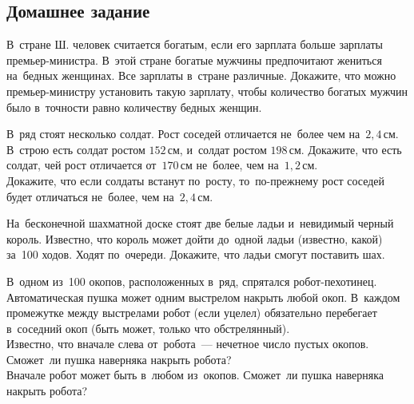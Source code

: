 

\subsection*{Домашнее задание}



\begin{problems}

\item
В~стране Ш. человек считается богатым, если его зарплата больше зарплаты
премьер-министра.
В~этой стране богатые мужчины предпочитают жениться на~бедных женщинах.
Все зарплаты в~стране различные.
Докажите, что можно премьер-министру установить такую зарплату, чтобы
количество богатых мужчин было в~точности равно количеству бедных женщин.

\item
В~ряд стоят несколько солдат.
Рост соседей отличается не~более чем на~$2{,}4\,\text{см}$.
\\
\sp
В~строю есть солдат ростом $152\,\text{см}$, и~солдат ростом $198\,\text{см}$.
Докажите, что есть солдат, чей рост отличается от~$170\,\text{см}$ не~более, чем
на~$1{,}2\,\text{см}$.
\\
\sp
Докажите, что если солдаты встанут по~росту, то~по-прежнему рост соседей будет
отличаться не~более, чем на~$2{,}4\,\text{см}$.

\item
На~бесконечной шахматной доске стоят две белые ладьи и~невидимый черный король.
Известно, что король может дойти до~одной ладьи (известно, какой) за~100 ходов.
Ходят по~очереди.
Докажите, что ладьи смогут поставить шах.

\item
В~одном из~100 окопов, расположенных в~ряд, спрятался робот-пехотинец.
Автоматическая пушка может одним выстрелом накрыть любой окоп.
В~каждом промежутке между выстрелами робот (если уцелел) обязательно перебегает
в~соседний окоп (быть может, только что обстрелянный).
\\
\sp
Известно, что вначале слева от~робота~--- нечетное число пустых окопов.
Сможет~ли пушка наверняка накрыть робота?
\\
\sp
Вначале робот может быть в~любом из~окопов.
Сможет~ли пушка наверняка накрыть робота?

\end{problems}

